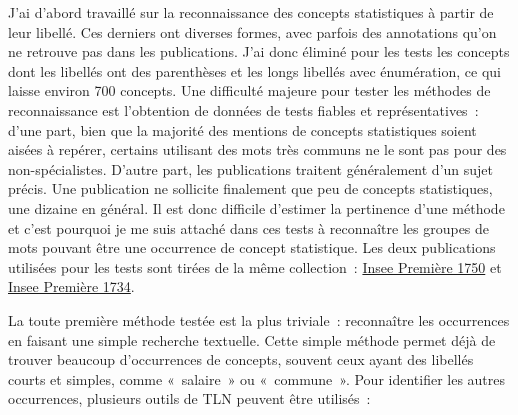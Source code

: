 J'ai d'abord travaillé sur la reconnaissance des concepts statistiques à partir de leur libellé. Ces derniers ont diverses formes, avec parfois des annotations qu'on ne retrouve pas dans les publications. J'ai donc éliminé pour les tests les concepts dont les libellés ont des parenthèses et les longs libellés avec énumération, ce qui laisse environ 700 concepts. Une difficulté majeure pour tester les méthodes de reconnaissance est l'obtention de données de tests fiables et représentatives~: d'une part, bien que la majorité des mentions de concepts statistiques soient aisées à repérer, certains utilisant des mots très communs ne le sont pas pour des non-spécialistes. D'autre part, les publications traitent généralement d'un sujet précis. Une publication ne sollicite finalement que peu de concepts statistiques, une dizaine en général. Il est donc difficile d'estimer la pertinence d'une méthode et c'est pourquoi je me suis attaché dans ces tests à reconnaître les groupes de mots pouvant être une occurrence de concept statistique. Les deux publications utilisées pour les tests sont tirées de la même collection~: \href{https://insee.fr/fr/statistiques/4129807}{Insee Première 1750} et \href{https://insee.fr/fr/statistiques/3703745}{Insee Première 1734}.
\newline

La toute première méthode testée est la plus triviale~: reconnaître les occurrences en faisant une simple recherche textuelle. Cette simple méthode permet déjà de trouver beaucoup d'occurrences de concepts, souvent ceux ayant des libellés courts et simples, comme «~salaire~» ou «~commune~». Pour identifier les autres occurrences, plusieurs outils de TLN peuvent être utilisés~:
\newline

